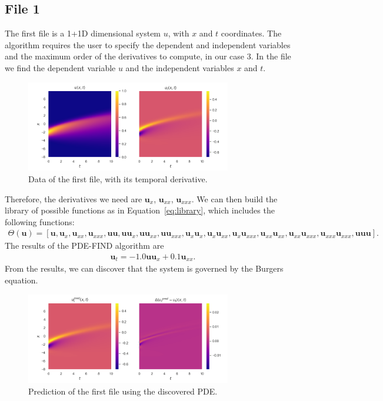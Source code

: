\documentclass[unicode,11pt,a4paper,oneside,numbers=endperiod,openany]{scrartcl}
\begin{document}
\subsection*{File 1}
The first file is a 1+1D dimensional system $u$, with $x$ and $t$ coordinates.
The algorithm requires the user to specify the dependent and independent
variables
and the maximum order of the derivatives to compute, in our case 3.
In the file we find the dependent variable $u$ and the independent variables $x$
and $t$. 
\begin{figure}[h]
    \centering
    \includegraphics[width=0.8\textwidth]{../Task2/figures/data_1.png}
    \caption{Data of the first file, with its temporal derivative.}
\end{figure}
Therefore, the derivatives we need are $\mathbf{u}_x$, $\mathbf{u}_{xx}$, $\mathbf{u}_{xxx}$.
We can then build the library of possible functions as in
Equation~\eqref{eq:library}, which includes the following functions:
\begin{align}\label{eq:library1}
    \Theta(\mathbf{u}) = [ \mathbf{u}, \mathbf{u}_x, \mathbf{u}_{xx}, \mathbf{u}_{xxx}, \mathbf{u}\mathbf{u}, \mathbf{u} \mathbf{u}_x, \mathbf{u} \mathbf{u}_{xx}, \mathbf{u} \mathbf{u}_{xxx}, \mathbf{u}_x \mathbf{u}_x, \mathbf{u}_x \mathbf{u}_{xx}, \mathbf{u}_x \mathbf{u}_{xxx}, \mathbf{u}_{xx} \mathbf{u}_{xx}, \mathbf{u}_{xx} \mathbf{u}_{xxx}, \mathbf{u}_{xxx} \mathbf{u}_{xxx}, \mathbf{u}\mathbf{u}\mathbf{u} ].
\end{align}
The results of the PDE-FIND algorithm are
\begin{align}
    \mathbf{u}_t = -1.0 \mathbf{u} \mathbf{u}_x + 0.1 \mathbf{u}_{xx}.
\end{align}
From the results, we can discover that the system is governed by the
Burgers equation.
\begin{figure}[h]
    \centering
    \includegraphics[width=0.8\textwidth]{../Task2/figures/results_1.png}
    \caption{Prediction of the first file using the discovered PDE.}

\end{figure}
\end{document}

